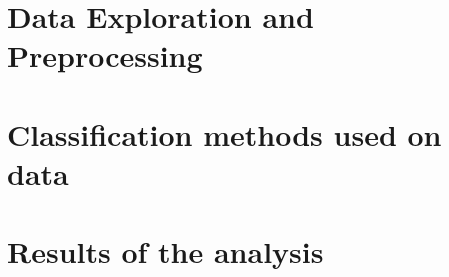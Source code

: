 \documentclass{article}
\numberwithin{equation}{section}
\theoremstyle{definition}
\theoremstyle{plain}
\theoremstyle{definition}
\theoremstyle{remark}
\begin{document}
\section{Data Exploration and Preprocessing}

\section{Classification methods used on data}

\section{Results of the analysis}


\end{document}
